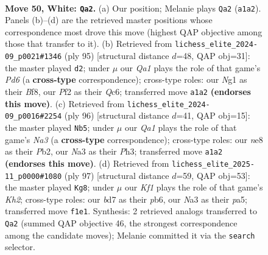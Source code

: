 \documentclass[11pt]{article}
\begin{document}
\clearpage

\begin{figure}[p]\centering
\begin{subfigure}{0.46\textwidth}\centering
\resizebox{\linewidth}{!}{%
\newchessgame
\chessboard[
  setfen={4n3/3b4/p5k1/3PPp1p/6p1/N7/5P2/Q4KNq w - - 3 50},
  showmover=false,
  pgfstyle=straightmove, color=movearrow, markmove={a1-a2}
]}
\caption{}
\end{subfigure}\hfill
\begin{subfigure}{0.46\textwidth}\centering
\resizebox{\linewidth}{!}{%
\newchessgame
\chessboard[
  setfen={1Q3bk1/1n6/2q3p1/5pN1/8/3p2PP/5P1K/8 b - - 0 48},
  showmover=false,
  pgfstyle=straightmove, color=movearrow, markmove={d3-d2}
]}
\caption{}
\end{subfigure}
\\[4pt]
\begin{subfigure}{0.46\textwidth}\centering
\resizebox{\linewidth}{!}{%
\newchessgame
\chessboard[
  setfen={q7/P4nkp/Q2p2p1/2p2p2/5P2/N6P/1PK5/8 w - - 8 49},
  showmover=false,
  pgfstyle=straightmove, color=movearrow, markmove={a3-b5}
]}
\caption{}
\end{subfigure}\hfill
\begin{subfigure}{0.46\textwidth}\centering
\resizebox{\linewidth}{!}{%
\newchessgame
\chessboard[
  setfen={8/1p4pk/pP5p/P7/3Pq3/3n1N2/2Q3P1/7K b - - 13 49},
  showmover=false,
  pgfstyle=straightmove, color=movearrow, markmove={h7-g8}
]}
\caption{}
\end{subfigure}
\caption{\textbf{Move 50, White: \texttt{Qa2}.} (a) Our position; Melanie plays \texttt{Qa2} (\texttt{a1a2}). Panels (b)--(d) are the retrieved master positions whose correspondence most drove this move (highest QAP objective among those that transfer to it). (b) Retrieved from \texttt{lichess\_elite\_2024-09\_p0021\#1346} (ply 95) [structural distance $d$=48, QAP obj=31]: the master played \texttt{d2}; under $\mu$ our \emph{Qa1} plays the role of that game's \emph{Pd6} (a \textbf{cross-type} correspondence); cross-type roles: our \emph{N}g1 as their \emph{B}f8, our \emph{P}f2 as their \emph{Q}c6; transferred move \texttt{a1a2} \textbf{(endorses this move)}. (c) Retrieved from \texttt{lichess\_elite\_2024-09\_p0016\#2254} (ply 96) [structural distance $d$=41, QAP obj=15]: the master played \texttt{Nb5}; under $\mu$ our \emph{Qa1} plays the role of that game's \emph{Na3} (a \textbf{cross-type} correspondence); cross-type roles: our \emph{n}e8 as their \emph{P}b2, our \emph{N}a3 as their \emph{P}h3; transferred move \texttt{a1a2} \textbf{(endorses this move)}. (d) Retrieved from \texttt{lichess\_elite\_2025-11\_p0000\#1080} (ply 97) [structural distance $d$=59, QAP obj=53]: the master played \texttt{Kg8}; under $\mu$ our \emph{Kf1} plays the role of that game's \emph{Kh2}; cross-type roles: our \emph{b}d7 as their \emph{p}b6, our \emph{N}a3 as their \emph{p}a5; transferred move \texttt{f1e1}. Synthesis: 2 retrieved analogs transferred to \texttt{Qa2} (summed QAP objective 46, the strongest correspondence among the candidate moves); Melanie committed it via the \texttt{search} selector.}
\label{fig:thought-m98}
\end{figure}
\end{document}
